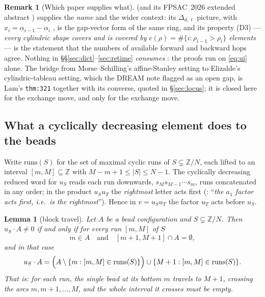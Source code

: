 \documentclass[11pt]{article}
\theoremstyle{plain}
\newtheorem{lem}[thm]{Lemma}
\theoremstyle{definition}
\newtheorem{rem}[thm]{Remark}
\newcommand{\Z}{\mathbb{Z}}
\begin{document}
\begin{rem}[Which paper supplies what]
\cite{Elizalde2507} (and its FPSAC~2026 extended abstract \cite{ElizaldeFPSAC}) supplies the
\emph{name} and the wider context: its $\Delta_{d,\ell}$ picture, with
$x_i=\alpha_{i-1}-\alpha_i$ \cite[\S4.2]{ElizaldeFPSAC}, is the gap-vector form of the same
ring, and its property (D3) --- \emph{every cylindric shape covers and is covered by
$c(\rho)=\#\{i:\rho_{i-1}>\rho_i\}$ elements} \cite[p.~5]{ElizaldeFPSAC} --- is the statement
that the numbers of available forward and backward hops agree. Nothing in
\S\S\ref{sec:dict}--\ref{sec:retime} \emph{consumes} \cite{Elizalde2507}: the proofs run on
\eqref{eq:ui} alone. The bridge from Morse--Schilling's affine-Stanley setting to Elizalde's
cylindric-tableau setting, which the DREAM note flagged as an open gap, is Lam's
\texttt{thm:321} together with its converse, quoted in \S\ref{sec:locus}; it is closed here for
the exchange move, and only for the exchange move.
\end{rem}

\subsection{What a cyclically decreasing element does to the beads}

Write $\mathrm{runs}(S)$ for the set of maximal cyclic runs of $S\subsetneq\Z/N$, each lifted
to an interval $[m,M]\subseteq\Z$ with $M-m+1\le|S|\le N-1$. The cyclically decreasing reduced
word for $u_S$ reads each run downwards, $s_Ms_{M-1}\cdots s_m$, runs concatenated in any
order; in the product $u_Su_T$ the \emph{rightmost} letter acts first
(\cite[Alternative Definition 2, l.853--861]{Lam2006}: ``\emph{the $a_1$ factor acts first,
i.e.\ is the rightmost}''). Hence in $v=u_Su_T$ the factor $u_T$ acts before $u_S$.

\begin{lem}[block travel]\label{lem:travel}
Let $A$ be a bead configuration and $S\subsetneq\Z/N$. Then $u_S\cdot A\ne0$ if and only if
for every run $[m,M]$ of $S$
\begin{equation}\label{eq:trav}
  m\in A\quad\text{and}\quad [m+1,M+1]\cap A=\emptyset ,
\end{equation}
and in that case
\[
  u_S\cdot A=\Bigl(A\setminus\{m:[m,M]\in\mathrm{runs}(S)\}\Bigr)\cup\{M+1:[m,M]\in\mathrm{runs}(S)\}.
\]
That is: \emph{for each run, the single bead at its bottom $m$ travels to $M+1$, crossing the
arcs $m,m+1,\dots,M$, and the whole interval it crosses must be empty.}
\end{lem}
\end{document}
